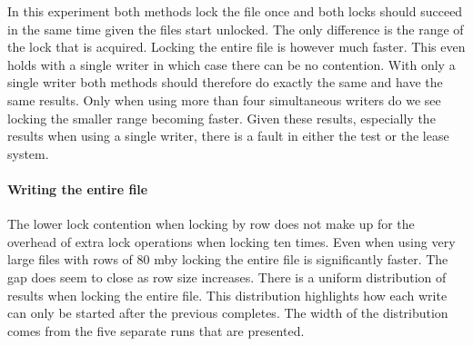 In this experiment both methods lock the file once and both locks should succeed in the same time given the files start unlocked. The only difference is the range of the lock that is acquired. Locking the entire file is however much faster. This even holds with a single writer in which case there can be no contention. With only a single writer both methods should therefore do exactly the same and have the same results. Only when using more than four simultaneous writers do we see locking the smaller range becoming faster. Given these results, especially the results when using a single writer, there is a fault in either the test or the lease system.
%
\paragraph{Writing the entire file}
The lower lock contention when locking by row does not make up for the overhead of extra lock operations when locking ten times. Even when using very large files with rows of 80 \ac{mby} locking the entire file is significantly faster. The gap does seem to close as row size increases. There is a uniform distribution of results when locking the entire file. This distribution highlights how each write can only be started after the previous completes. The width of the distribution comes from the five separate runs that are presented.
